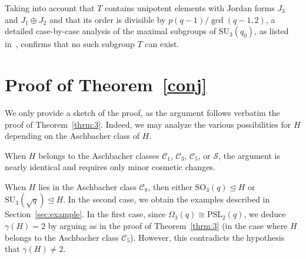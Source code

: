 \documentclass{amsart}
\begin{document}
Taking into account that $T$ contains unipotent elements with Jordan forms $J_3$ and $J_1 \oplus J_2$ and that its order is divisible by $p(q - 1)/\gcd(q - 1, 2)$, a detailed case-by-case analysis of the maximal subgroups of $\mathrm{SU}_3(q_0)$, as listed in~\cite[Tables~8.5 and~8.6]{bray}, confirms that no such subgroup $T$ can exist.

\section{Proof of Theorem~\ref{conj}}
We only provide a sketch of the proof, as the argument follows verbatim the proof of Theorem~\ref{thrm:3}. Indeed, we may analyze the various possibilities for $H$ depending on the Aschbacher class of $H$.

When $H$ belongs to the Aschbacher classes $\mathcal{C}_1$, $\mathcal{C}_3$, $\mathcal{C}_5$, or $\mathcal{S}$, the argument is nearly identical and requires only minor cosmetic changes.

When $H$ lies in the Aschbacher class $\mathcal{C}_8$, then either $\mathrm{SO}_3(q) \unlhd H$ or $\mathrm{SU}_3(\sqrt{q}) \unlhd H$. In the second case, we obtain the examples described in Section~\ref{sec:example}. In the first case, since $\Omega_3(q) \cong \mathrm{PSL}_2(q)$, we deduce $\gamma(H)=2$ by arguing as in the proof of Theorem~\ref{thrm:3} (in the case where $H$ belongs to the Aschbacher class $\mathcal{C}_5$). However, this contradicts the hypothesis that $\gamma(H)\ne 2$.
\end{document}
